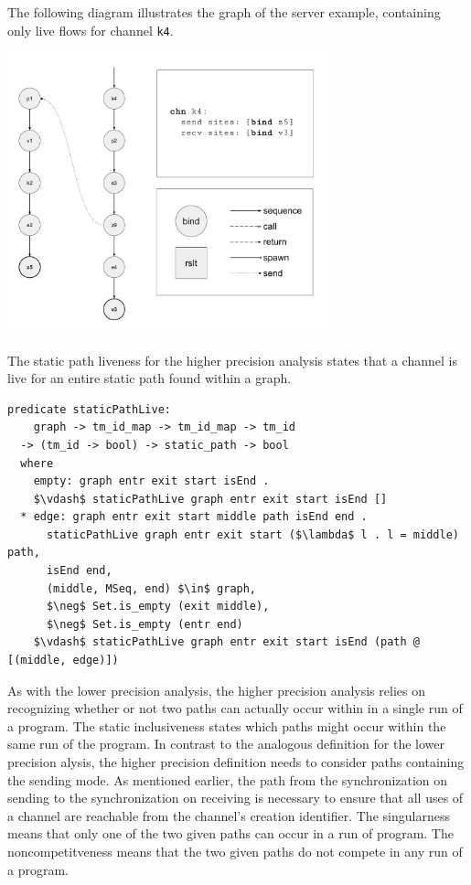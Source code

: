 \documentclass[letterpaper, 11pt]{report}
\begin{document}
The following diagram illustrates the graph of the server example,
containing only live flows for channel \lstinline{k4}. \

\includegraphics[width=0.7\textwidth]{cml-graph-k4.pdf}

The static path liveness for the higher precision analysis states
that a channel is live for an entire static path found within a graph.

\begin{lstlisting}[language=logic, mathescape]
  predicate staticPathLive:
    graph -> tm_id_map -> tm_id_map -> tm_id
  -> (tm_id -> bool) -> static_path -> bool
  where
    empty: graph entr exit start isEnd .
    $\vdash$ staticPathLive graph entr exit start isEnd []
  * edge: graph entr exit start middle path isEnd end .
      staticPathLive graph entr exit start ($\lambda$ l . l = middle) path,
      isEnd end,
      (middle, MSeq, end) $\in$ graph,
      $\neg$ Set.is_empty (exit middle),
      $\neg$ Set.is_empty (entr end)
    $\vdash$ staticPathLive graph entr exit start isEnd (path @ [(middle, edge)])

\end{lstlisting}

As with the lower precision analysis, the higher precision analysis relies on recognizing
whether or not two paths can actually occur within in a single run of a program. The static
inclusiveness states which paths might occur within the same run of the program.
In contrast to the analogous definition for the lower precision
alysis, the higher precision definition needs to consider paths containing the
sending mode. As mentioned earlier, the path from the synchronization on sending to the
synchronization on receiving is necessary to ensure that all uses of a channel are reachable
from the channel's creation identifier. The singularness means that only one of the two
given paths can occur in a run of program. The noncompetitveness means that the two
given paths do not compete in any run of a program. 
\end{document}
